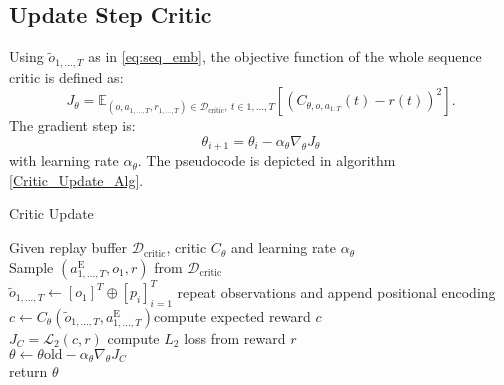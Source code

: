 \subsection{Update Step Critic}
Using $\tilde{o}_{1, ..., T}$ as in \ref{eq:seq_emb}, the objective function of the whole sequence critic is defined as:
\begin{equation}
    J_{\theta} = \mathbb{E}_{(o, a_{1,...,T}, r_{1,...,T}) \in \mathcal{D}_{\text{critic}},\ t \in {1, ..., T}}\left[(C_{\theta, o, a_{1:T}}(t) - r(t))^2\right].
\end{equation}
The gradient step is:
\begin{equation*}
    \theta_{i+1} = \theta_i - \alpha_{\theta} \nabla_{\theta}J_{\theta}
\end{equation*}
with learning rate $\alpha_{\theta}$. The pseudocode is depicted in algorithm \ref{Critic_Update_Alg}.
\begin{algorithm}
    \caption{Critic Update}
    \label{Critic_Update_Alg}
    Given replay buffer $\mathcal{D}_{\text{critic}}$, critic $C_{\theta}$ and learning rate $\alpha_{\theta}$\\
    Sample $(a^{\text{E}}_{1, ..., T}, o_1, r)$ from $\mathcal{D}_{\text{critic}}$\\
    $\tilde{o}_{1, ..., T} \gets [o_1]^T \oplus [p_i]_{i=1}^T$ \hfill{repeat observations and append positional encoding} \\
    $c \gets C_{\theta}(\tilde{o}_{1, ..., T}, a^{\text{E}}_{1, ..., T})$\hfill{compute expected reward $c$} \\
    
    $J_{C} = \mathcal{L}_2(c, r)$ \hfill{compute $L_2$ loss from reward $r$} \\
    $\theta \gets \theta{\mathrm{old}} - \alpha_{\theta} \nabla_{\theta}J_{C}$\\
    return $\theta$
\end{algorithm}
